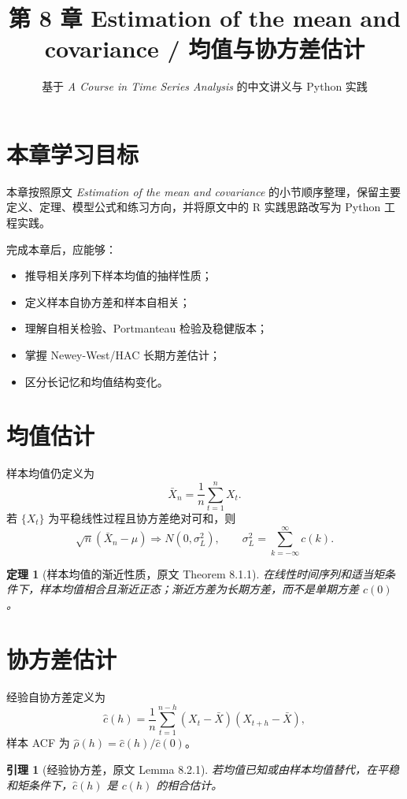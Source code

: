\documentclass[11pt,a4paper]{ctexart}
\title{第 8 章 \quad Estimation of the mean and covariance / 均值与协方差估计}
\author{基于 \textit{A Course in Time Series Analysis} 的中文讲义与 Python 实践}
\date{}
\newtheorem{theorem}{定理}[section]
\newtheorem{lemma}{引理}[section]
\begin{document}
\maketitle

\section*{本章学习目标}

本章按照原文 \textit{Estimation of the mean and covariance} 的小节顺序整理，保留主要定义、定理、模型公式和练习方向，并将原文中的 R 实践思路改写为 Python 工程实践。

完成本章后，应能够：
\begin{itemize}
  \item 推导相关序列下样本均值的抽样性质；
  \item 定义样本自协方差和样本自相关；
  \item 理解自相关检验、Portmanteau 检验及稳健版本；
  \item 掌握 Newey-West/HAC 长期方差估计；
  \item 区分长记忆和均值结构变化。
\end{itemize}

\section{均值估计}

样本均值仍定义为
\[
  \bar X_n=\frac1n\sum_{t=1}^n X_t.
\]
若 \(\{X_t\}\) 为平稳线性过程且协方差绝对可和，则
\[
  \sqrt n(\bar X_n-\mu)\Rightarrow N(0,\sigma_L^2),
\qquad
  \sigma_L^2=\sum_{k=-\infty}^{\infty}c(k).
\]
\begin{theorem}[样本均值的渐近性质，原文 Theorem 8.1.1]
在线性时间序列和适当矩条件下，样本均值相合且渐近正态；渐近方差为长期方差，而不是单期方差 \(c(0)\)。
\end{theorem}

\section{协方差估计}

经验自协方差定义为
\[
  \hat c(h)=\frac1n\sum_{t=1}^{n-h}(X_t-\bar X)(X_{t+h}-\bar X),
\]
样本 ACF 为 \(\hat\rho(h)=\hat c(h)/\hat c(0)\)。

\begin{lemma}[经验协方差，原文 Lemma 8.2.1]
若均值已知或由样本均值替代，在平稳和矩条件下，\(\hat c(h)\) 是 \(c(h)\) 的相合估计。
\end{lemma}
\end{document}
